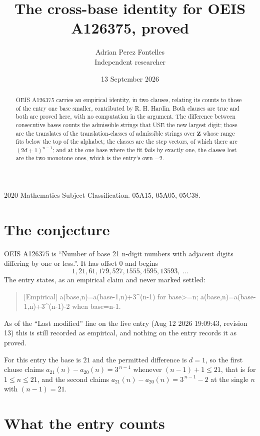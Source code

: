 \documentclass[11pt,a4paper]{article}
\title{The cross-base identity for OEIS A126375, proved}
\author{Adrian Perez Fontelles\\ \small Independent researcher}
\date{13 September 2026}
\theoremstyle{plain}
\theoremstyle{definition}
\begin{document}
\maketitle

\begin{abstract}
OEIS A126375 carries an empirical identity, in two clauses, relating its counts to those of the
entry one base smaller, contributed by R. H. Hardin. Both clauses are true and both are proved
here, with no computation in the argument. The difference between consecutive bases counts the
admissible strings that USE the new largest digit; those are the translates of the
translation-classes of admissible strings over $\mathbf{Z}$ whose range fits below the top of
the alphabet; the classes are the step vectors, of which there are $(2d+1)^{n-1}$; and at the
one base where the fit fails by exactly one, the classes lost are the two monotone ones, which
is the entry's own $-2$.
\end{abstract}

\noindent\small 2020 Mathematics Subject Classification. 05A15, 05A05, 05C38.\normalsize

\section{The conjecture}

OEIS A126375 is ``Number of base 21 n-digit numbers with adjacent digits differing by one or less.''. It has offset $0$ and begins
\[
1, 21, 61, 179, 527, 1555, 4595, 13593,\ \dots
\]
The entry states, as an empirical claim and never marked settled:
\begin{quote}
[Empirical] a(base,n)=a(base-1,n)+3\textasciicircum{}(n-1) for base>=n; a(base,n)=a(base-1,n)+3\textasciicircum{}(n-1)-2 when base=n-1.
\end{quote}
As of the ``Last modified'' line on the live entry (Aug 12 2026 19:09:43, revision 13)
this is still recorded as empirical, and nothing on the entry records it as proved.

For this entry the base is $21$ and the permitted difference is $d=1$, so the first clause
claims $a_{21}(n)-a_{20}(n)=3^{\,n-1}$ whenever $(n-1)+1\le21$, that is for
$1\le n\le21$, and the second claims $a_{21}(n)-a_{20}(n)=3^{\,n-1}-2$ at the single
$n$ with $(n-1)=21$.

\section{What the entry counts}
\end{document}
